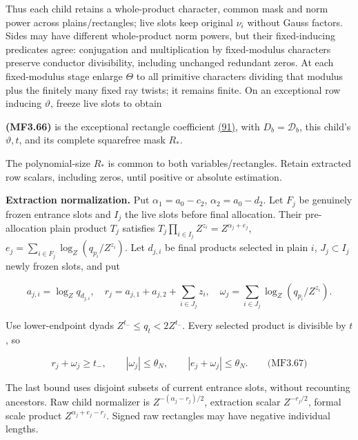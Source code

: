 Thus each child retains a whole-product character, common mask and norm power across plains/rectangles; live slots keep original \(\nu_i\) without Gauss factors. Sides may have different whole-product norm powers, but their fixed-inducing predicates agree: conjugation and multiplication by fixed-modulus characters preserve conductor divisibility, including unchanged redundant zeros. At each fixed-modulus stage enlarge \(\Theta\) to all primitive characters dividing that modulus plus the finitely many fixed ray twists; it remains finite. On an exceptional row inducing \(\vartheta\), freeze live slots to obtain

\hypertarget{mf:eq:B3.66}{}

\label{mf:eq:B3.66}

\textbf{(MF3.66)} is the exceptional rectangle coefficient \protect\hyperlink{cf:eq:D.27}{(91)}, with \(D_b=\mathcal D_b\), this child's \(\vartheta,t\), and its complete squarefree mask \(R_*\).

The polynomial-size \(R_*\) is common to both variables/rectangles. Retain extracted row scalars, including zeros, until positive or absolute estimation.

\textbf{Extraction normalization.} Put \(\alpha_1=a_0-c_2\), \(\alpha_2=a_0-d_2\). Let \(F_j\) be genuinely frozen entrance slots and \(I_j\) the live slots before final allocation. Their pre-allocation plain product \(T_j\) satisfies \(T_j\prod_{i\in I_j}Z^{z_i}=Z^{\alpha_j+e_j}\), \(e_j=\sum_{i\in F_j}\log_Z(q_{p_i}/Z^{z_i})\). Let \(d_{j,i}\) be final products selected in plain \(i\), \(J_j\subset I_j\) newly frozen slots, and put

\[
a_{j,i}=\log_Zq_{d_{j,i}},\quad
r_j=a_{j,1}+a_{j,2}+\sum_{i\in J_j}z_i,\quad
\omega_j=\sum_{i\in J_j}\log_Z(q_{p_i}/Z^{z_i}).
\]

Use lower-endpoint dyads \(Z^{t_-}\le q_t<2Z^{t_-}\). Every selected product is divisible by \(t\), so

\hypertarget{mf:eq:B3.67}{}

\label{mf:eq:B3.67}

\[
r_j+\omega_j\ge t_-,\qquad |\omega_j|\le\theta_N,
\qquad |e_j+\omega_j|\le\theta_N.
\qquad\text{(MF3.67)}
\]

The last bound uses disjoint subsets of current entrance slots, without recounting ancestors. Raw child normalizer is \(Z^{-(\alpha_j-r_j)/2}\), extraction scalar \(Z^{-r_j/2}\), formal scale product \(Z^{\alpha_j+e_j-r_j}\). Signed raw rectangles may have negative individual lengths.

